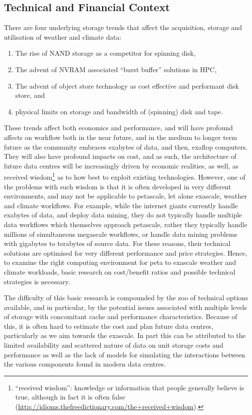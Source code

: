 \subsection{Technical and Financial Context}

There are four underlying storage trends that affect the acquisition, storage and utilisation of weather and climate data: 
\begin{enumerate}
\item The rise of NAND storage as a competitor for spinning disk,
\item The advent of NVRAM associated ``burst buffer'' solutions in HPC,
\item The advent of object store technology as cost effective and performant disk store, and
\item physical limits on storage and bandwidth of (spinning) disk and tape.
\end{enumerate}

These trends affect both economics and performance, and will have profound affects on workflow both in the near future, and in the medium to longer term future as 
the community embraces exabytes of data, and then, exaflop computers.  
They will also have profound impacts on cost, and as such, the architecture of future data centres will be increasingly driven by economic realities, as well, as 
received wisdom\footnote{``received wisdom'': knowledge or information that people generally believe is true, although in fact it is often false 
(\url{http://idioms.thefreedictionary.com/the+received+wisdom}). }
as to how best to exploit existing technologies. However, one of the problems with such wisdom is that it is often developed in very different environments, and may 
not be applicable to petascale, let alone exascale, weather and climate workflows. For example, while the internet giants currently handle exabytes of data, and 
deploy data mining, they do not typically handle multiple data workflows which themselves approach petascale, rather they typically handle millions of simultaneous 
megascale workflows, or handle data mining problems with gigabytes to terabytes of source data. For these reasons, their technical solutions are optimised for very 
different performance and price strategies. Hence, to examine the right computing environment for peta to exascale weather and climate workloads, basic research 
on cost/benefit ratios and possible technical strategies is necessary.

The difficulty of this basic research is compounded by the zoo of technical options available, and in particular, by the potential issues associated with multiple levels 
of storage with concomitant cache and performance characteristics. Because of this, it is often hard to estimate the cost and plan future data centres, particularly as 
we aim towards the exascale. In part this can be attributed to the limited availability and scattered nature of data on unit storage costs and performance as well as 
the lack of models for simulating the interactions between the various components found in modern data centres.  

